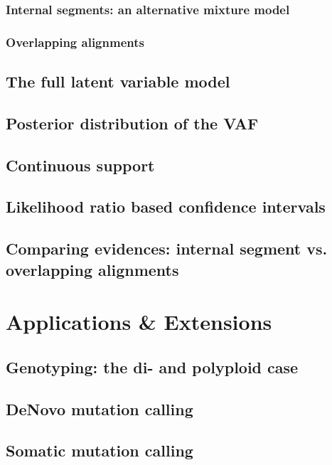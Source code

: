 \documentclass[12pt,a4paper]{article}
\numberwithin{equation}{section}
\begin{document}
\subsubsection{Internal segments: an alternative mixture model}




\subsubsection{Overlapping alignments}

\subsection{The full latent variable model}

\subsection{Posterior distribution of the VAF}

\subsection{Continuous support}

\subsection{Likelihood ratio based confidence intervals}

\subsection{Comparing evidences: internal segment vs. overlapping alignments}

\section{Applications \& Extensions}

\subsection{Genotyping: the di- and polyploid case}

\subsection{DeNovo mutation calling}

\subsection{Somatic mutation calling}
\end{document}
